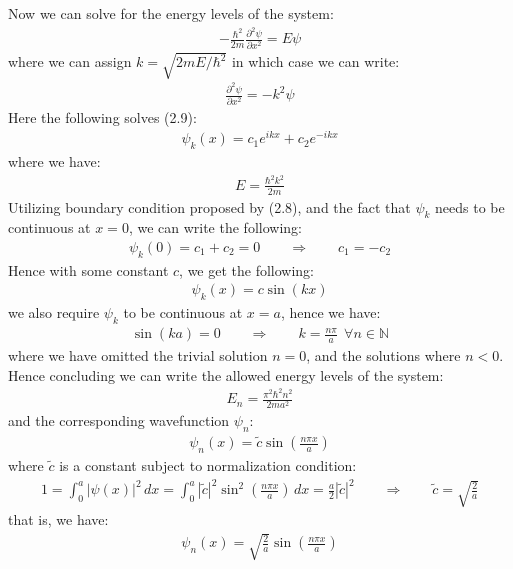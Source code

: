 \documentclass[11pt]{book}
\theoremstyle{break}
\theoremstyle{break}
\newcommand{\N}{\mathbb{N}}
\newcommand{\pd}{\partial}
\newcommand{\that}[1]{\widetilde{#1}}
\begin{document}
Now we can solve for the energy levels of the system:
\begin{align*}
-\frac{\hbar^2}{2m}\frac{\pd^2 \psi}{\pd x^2} = E\psi
\end{align*}
where we can assign $k = \sqrt{2mE/\hbar^2}$ in which case we can write:
\begin{align}
\frac{\pd^2\psi}{\pd x^2} = -k^2\psi
\end{align}
Here the following solves (2.9):
\begin{align*}
\psi_k(x) = c_1 e^{ikx} + c_2 e^{-ikx}
\end{align*}
where we have:
\begin{align*}
E = \frac{\hbar^2k^2}{2m}
\end{align*}
Utilizing boundary condition proposed by (2.8), and the fact that $\psi_k$ needs to be continuous at $x=0$, we can write the following:
\begin{align*}
\psi_k(0) = c_1 + c_2 = 0 \qquad \Rightarrow \qquad c_1 = -c_2
\end{align*} 
Hence with some constant $c$, we get the following:
\begin{align*}
\psi_k (x) = c \sin(kx)
\end{align*}
we also require $\psi_k$ to be continuous at $x = a$, hence we have:
\begin{align*}
\sin(ka) = 0 \qquad \Rightarrow \qquad k = \frac{n\pi}{a}\ \ \forall n \in \N
\end{align*}
where we have omitted the trivial solution $n = 0$, and the solutions where $n<0$. Hence concluding we can write the allowed energy levels of the system:
\begin{align*}
E_n = \frac{\pi^2\hbar^2 n^2}{2ma^2}
\end{align*}
and the corresponding wavefunction $\psi_n$:
\begin{align*}
\psi_n(x) = \that{c}\sin\left(\frac{n\pi x}{a}\right)
\end{align*}
where $\that{c}$ is a constant subject to normalization condition:
\begin{align*}
1  = \int_0^a |\psi(x)|^2 \, dx =\int_0^a |\that{c}|^2 \sin^2\left(\frac{n\pi x}{a}\right)\, dx = \frac{a}{2}|\that{c}|^2  \qquad \Rightarrow \qquad \that{c} = \sqrt{\frac{2}{a}} 
\end{align*}
that is, we have:
\begin{align*}
\psi_n(x) = \sqrt{\frac{2}{a}}\sin\left( \frac{n\pi x}{a}\right)
\end{align*}
\end{document}
